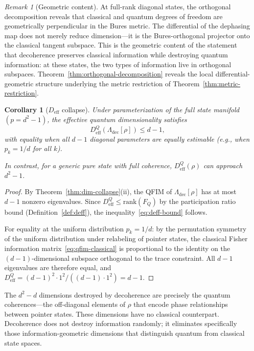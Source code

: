 \documentclass[12pt,a4paper]{article}
\newtheorem{corollary}[theorem]{Corollary}
\theoremstyle{definition}
\theoremstyle{remark}
\newtheorem{remark}[theorem]{Remark}
\begin{document}
\begin{remark}[Geometric content]
\label{rem:geometric-content}
At full-rank diagonal states, the orthogonal decomposition reveals that classical and quantum degrees of freedom are geometrically perpendicular in the Bures metric.  The differential of the dephasing map does not merely reduce dimension---it is the Bures-orthogonal projector onto the classical tangent subspace.  This is the geometric content of the statement that decoherence preserves classical information while destroying quantum information: at these states, the two types of information live in orthogonal subspaces.  Theorem~\ref{thm:orthogonal-decomposition} reveals the local differential-geometric structure underlying the metric restriction of Theorem~\ref{thm:metric-restriction}.
\end{remark}

\begin{corollary}[$D_{\mathrm{eff}}$ collapse]
\label{cor:deff-collapse}
Under parameterization of the full state manifold $(p = d^2 - 1)$, the effective quantum dimensionality satisfies
\begin{equation}
\label{eq:deff-bound}
D_{\mathrm{eff}}^Q(\Lambda_{\mathrm{dec}}[\rho]) \leq d - 1,
\end{equation}
with equality when all $d - 1$ diagonal parameters are equally estimable (e.g., when $p_k = 1/d$ for all $k$).

In contrast, for a generic pure state with full coherence, $D_{\mathrm{eff}}^Q(\rho)$ can approach $d^2 - 1$.
\end{corollary}

\begin{proof}
By Theorem~\ref{thm:dim-collapse}(ii), the QFIM of $\Lambda_{\mathrm{dec}}[\rho]$ has at most $d - 1$ nonzero eigenvalues. Since $D_{\mathrm{eff}}^Q \leq \mathrm{rank}(F_Q)$ by the participation ratio bound (Definition~\ref{def:deff}), the inequality~\eqref{eq:deff-bound} follows.

For equality at the uniform distribution $p_k = 1/d$: by the permutation symmetry of the uniform distribution under relabeling of pointer states, the classical Fisher information matrix~\eqref{eq:qfim-classical} is proportional to the identity on the $(d-1)$-dimensional subspace orthogonal to the trace constraint. All $d - 1$ eigenvalues are therefore equal, and $D_{\mathrm{eff}}^Q = (d-1)^2 \cdot 1^2 / ((d-1) \cdot 1^2) = d - 1$.
\end{proof}

The $d^2 - d$ dimensions destroyed by decoherence are precisely the quantum coherences---the off-diagonal elements of $\rho$ that encode phase relationships between pointer states. These dimensions have no classical counterpart. Decoherence does not destroy information randomly; it eliminates specifically those information-geometric dimensions that distinguish quantum from classical state spaces.
\end{document}
